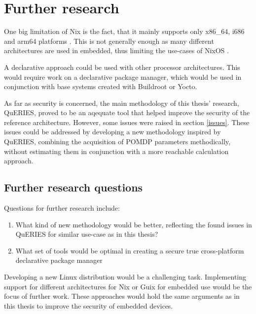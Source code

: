 \chapter{Further research} \label{further}

One big limitation of Nix is the fact, that it mainly supports only
x86\_64, i686 and arm64 platforms \cite{nixosNixOSManual}. This is not
generally enough as many different architectures are used in
embedded, thus limiting the use-cases of
NixOS \cite{fysarakis2014embedded}.

A declarative approach could be used with other processor
architectures. This would require work on a declarative package
manager, which would be used in conjunction with base systems created
with Buildroot or Yocto.

As far as security is concerned, the main methodology of this thesis'
research, QuERIES, proved to be an aqequate tool that helped
improve the security of the reference architecture. However, some
issues were raised in section \ref{issues}. These issues could be
addressed by developing a new methodology inspired by QuERIES,
combining the acquisition of POMDP parameters methodically, without estimating them
in conjunction with a more reachable calculation approach.

\section{Further research questions}

Questions for further research include:
\begin{enumerate}
  \item{What kind of new methodology would be better, reflecting
    the found issues in QuERIES for similar use-case as in this
    thesis?}
  \item What set of tools would be optimal in creating a secure true
    cross-platform declarative package manager 
    
\end{enumerate}

Developing a new Linux distribution would be a challenging task. Implementing support for different architectures for Nix or Guix for
embedded use would be the focus of further work. These approaches
would hold the same arguments as in this thesis to improve the
security of embedded devices.

